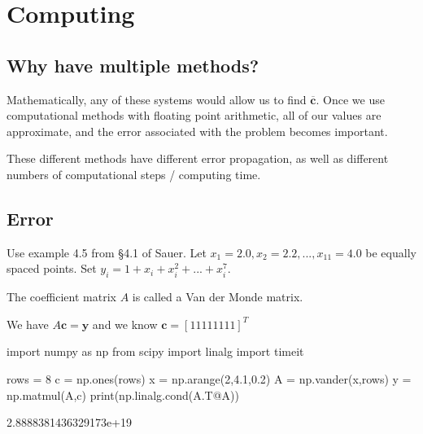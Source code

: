 \documentclass[12pt,letterpaper,noanswers]{exam}
\begin{document}
\section{Computing}

\subsection{Why have multiple methods?}

Mathematically, any of these systems would allow us to find $\overline{\mathbf{c}}$.  Once we use computational methods with floating point arithmetic, all of our values are approximate, and the error associated with the problem becomes important.

These different methods have different error propagation, as well as different numbers of computational steps / computing time.

\subsection{Error}

Use example 4.5 from \S 4.1 of Sauer.  Let $x_1 = 2.0, x_2 = 2.2, ..., x_{11} = 4.0$ be equally spaced points.  Set $y_i = 1+x_i + x_i^2+...+x_i^7$.

The coefficient matrix $A$ is called a Van der Monde matrix.

We have $A\mathbf{c} = \mathbf{y}$ and we know $\mathbf{c} = [1 1 1 1 1 1 1 1]^T$

\begin{pyin}
import numpy as np
from scipy import linalg
import timeit
\end{pyin}

\begin{pyin}
rows = 8
c = np.ones(rows)
x = np.arange(2,4.1,0.2)
A = np.vander(x,rows)
y = np.matmul(A,c)
print(np.linalg.cond(A.T@A))
\end{pyin}

\begin{pyout}
2.8888381436329173e+19
\end{pyout}
\end{document}
